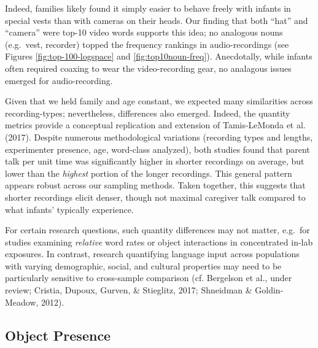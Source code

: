 \documentclass[man]{apa6}
\theoremstyle{definition}
\theoremstyle{definition}
\theoremstyle{definition}
\theoremstyle{remark}
\begin{document}
Indeed, families likely found it simply easier to behave freely with
infants in special vests than with cameras on their heads. Our finding
that both \enquote{hat} and \enquote{camera} were top-10 video words
supports this idea; no analogous nouns (e.g.~vest, recorder) topped the
frequency rankings in audio-recordings (see Figures
\ref{fig:top-100-logspace} and \ref{fig:top10noun-freq}). Anecdotally,
while infants often required coaxing to wear the video-recording gear,
no analagous issues emerged for audio-recording.

Given that we held family and age constant, we expected many
similarities across recording-types; nevertheless, differences also
emerged. Indeed, the quantity metrics provide a conceptual replication
and extension of Tamis-LeMonda et al. (2017). Despite numerous
methodological variations (recording types and lengths, experimenter
presence, age, word-class analyzed), both studies found that parent talk
per unit time was significantly higher in shorter recordings on average,
but lower than the \emph{highest} portion of the longer recordings. This
general pattern appears robust across our sampling methods. Taken
together, this suggests that shorter recordings elicit denser, though
not maximal caregiver talk compared to what infants' typically
experience.

For certain research questions, such quantity differences may not
matter, e.g.~for studies examining \emph{relative} word rates or object
interactions in concentrated in-lab exposures. In contrast, research
quantifying language input across populations with varying demographic,
social, and cultural properties may need to be particularly sensitive to
cross-sample comparison (cf. Bergelson et al., under review; Cristia,
Dupoux, Gurven, \& Stieglitz, 2017; Shneidman \& Goldin-Meadow, 2012).

\subsection{Object Presence}\label{object-presence}
\end{document}
